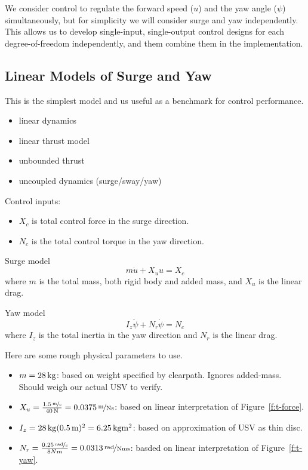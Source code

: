 \documentclass[11pt,draftcls,journal,onecolumn]{IEEEtran}
\begin{document}
We consider control to regulate the forward speed ($u$) and the yaw angle ($\psi$) simultaneously, but for simplicity we will consider surge and yaw independently.  This allows us to develop single-input, single-output control designs for each degree-of-freedom independently, and them combine them in the implementation.

\subsection{Linear Models of Surge and Yaw}
This is the simplest model and us useful as a benchmark for control performance.
\begin{itemize}
\item linear dynamics
\item linear thrust model
\item unbounded thrust
\item uncoupled dynamics (surge/sway/yaw)
\end{itemize}

Control inputs:
\begin{itemize}
\item $X_c$ is total control force in the surge direction.
\item $N_c$ is the total control torque in the yaw direction.
\end{itemize}

Surge model
\[
m \dot{u} + X_u u = X_c
\]
where $m$ is the total mass, both rigid body and added mass, and $X_u$ is the linear drag.

Yaw model
\[
I_z \ddot{\psi} + N_r \dot{\psi} = N_c
\]
where $I_z$ is the total inertia in the yaw direction and $N_r$ is the linear drag.

Here are some rough physical parameters to use.
\begin{itemize}
\item $m=\unit[28]{kg}$: based on weight specified by clearpath.  Ignores added-mass.  Should weigh our actual USV to verify.
\item $X_u=\frac{\unitfrac[1.5]{m}{s}}{\unit[40]{N}}=\unitfrac[0.0375]{m}{Ns}$: based on linear interpretation of Figure~\ref{f:t-force}.
\item $I_z = \unit[28]{kg} (\unit[0.5]{m})^2 = \unit[6.25]{kg m^2}$: based on approximation of USV as thin disc.
\item $N_r = \frac{\unitfrac[0.25]{rad}{s}}{\unit{8}{Nm}} = \unitfrac[0.0313]{rad}{Nms}$: basded on linear interpretation of Figure~\ref{f:t-yaw}.
\end{itemize}
\end{document}
